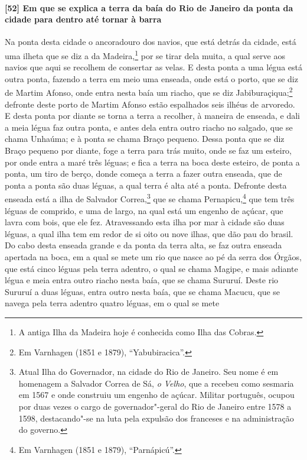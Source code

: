 \paragraph{[52] Em que se explica a terra da baía do Rio de Janeiro da ponta da cidade para
dentro até tornar à barra} \quad
Na ponta desta cidade o ancoradouro dos navios, que está detrás da cidade, está uma ilheta
que se diz a da Madeira,\footnote{ A antiga Ilha da Madeira hoje é conhecida como Ilha das
Cobras.} por se tirar dela muita, a qual serve aos navios que aqui se recolhem de
consertar as velas. E desta ponta a uma légua está outra ponta, fazendo a terra em meio
uma enseada, onde está o porto, que se diz de Martim Afonso, onde entra nesta baía um
riacho, que se diz Jabiburaçiqua;\footnote{ Em Varnhagen (1851 e 1879), ``Yabubiracica''.}
defronte deste porto de Martim Afonso estão espalhados seis ilhéus de arvoredo. E desta
ponta por diante se torna a terra a recolher, à maneira de enseada, e dali a meia légua
faz outra ponta, e antes dela entra outro riacho no salgado, que se chama Unhaúma; e à
ponta se chama Braço pequeno. Dessa ponta que se diz Braço pequeno por diante, foge a
terra para trás muito, onde se faz um esteiro, por onde entra a maré três léguas; e fica a
terra na boca deste esteiro, de ponta a ponta, um tiro de berço, donde começa a terra a
fazer outra enseada, que de ponta a ponta são duas léguas, a qual terra é alta até a
ponta. Defronte desta enseada está a ilha de Salvador Correa,\footnote{ Atual Ilha do
Governador, na cidade do Rio de Janeiro. Seu nome é em homenagem a Salvador Correa de Sá,
\textit{o Velho}, que a recebeu como sesmaria em 1567 e onde construiu um engenho de
açúcar. Militar português, ocupou por duas vezes o cargo de governador"-geral do Rio de
Janeiro entre 1578 a 1598, destacando"-se na luta pela expulsão dos franceses e na
administração do governo.} que se chama Pernapicu,\footnote{ Em Varnhagen (1851 e 1879),
``Parnápicú''.} que tem três léguas de comprido, e uma de largo, na qual está um engenho
de açúcar, que lavra com bois, que ele fez. Atravessando esta ilha por mar à cidade são
duas léguas, a qual ilha tem em redor de si oito ou nove ilhas, que dão pau do brasil. Do
cabo desta enseada grande e da ponta da terra alta, se faz outra enseada apertada na boca,
em a qual se mete um rio que nasce ao pé da serra dos Órgãos, que está cinco léguas pela
terra adentro, o qual se chama Magipe, e mais adiante légua e meia entra outro riacho
nesta baía, que se chama Sururuí. Deste rio Sururuí a duas léguas, entra outro nesta baía,
que se chama Macucu, que se navega pela terra adentro quatro léguas, em o qual se mete
